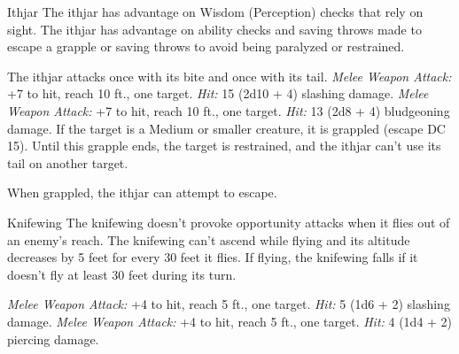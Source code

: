 \documentclass[10pt,a4paper,twoside,twocolumn,openany,bg=print,nodeprecatedcode]{dndbook}
\begin{document}
\begin{DndMonster}[float*=t]{Ithjar}
\DndMonsterBasics[
armor-class = {16 (natural armor)},
hit-points = {\DndDice{12d10 + 36}},
speed = {30 ft., 90 ft. (key)}
]
\DndMonsterAbilityScores[
 str = 18,
 dex = 20,
 con = 17,
 int = 3,
 wis = 10,
 cha = 5
]
\DndMonsterDetails[
skills = {Acrobatics +8, Perception +3},
senses = {blindsight 10 ft., darkvision 60 ft., passive perception 13},
challenge = 5,
]
The ithjar has advantage on Wisdom (Perception) checks that rely on sight.
The ithjar has advantage on ability checks and saving throws made to escape a grapple or saving throws to avoid being paralyzed or restrained.
\par
{}
The ithjar attacks once with its bite and once with its tail.
\textsl{Melee Weapon Attack:} +7 to hit, reach 10 ft., one target. \textsl{Hit:} 15 (2d10 + 4) slashing damage.
\textsl{Melee Weapon Attack:} +7 to hit, reach 10 ft., one target. \textsl{Hit:} 13 (2d8 + 4) bludgeoning damage. If the target is a Medium or smaller creature, it is grappled (escape DC 15). Until this grapple ends, the target is restrained, and the ithjar can't use its tail on another target.
\par
{}
When grappled, the ithjar can attempt to escape.
\end{DndMonster}



\begin{DndMonster}[float*=t]{Knifewing}
\DndMonsterBasics[
armor-class = {13 (natural armor)},
hit-points = {\DndDice{2d6 + 2}},
speed = {30 ft., 30 ft. (key), 30 ft. (key)}
]
\DndMonsterAbilityScores[
 str = 6,
 dex = 15,
 con = 13,
 int = 2,
 wis = 10,
 cha = 5
]
\DndMonsterDetails[
senses = {blindsight 10 ft., passive perception 10},
challenge = 1/8,
]
The knifewing doesn't provoke opportunity attacks when it flies out of an enemy's reach.
The knifewing can't ascend while flying and its altitude decreases by 5 feet for every 30 feet it flies. If flying, the knifewing falls if it doesn't fly at least 30 feet during its turn.
\par
{}
\textsl{Melee Weapon Attack:} +4 to hit, reach 5 ft., one target. \textsl{Hit:} 5 (1d6 + 2) slashing damage.
\textsl{Melee Weapon Attack:} +4 to hit, reach 5 ft., one target. \textsl{Hit:} 4 (1d4 + 2) piercing damage.
\end{DndMonster}
\end{document}
